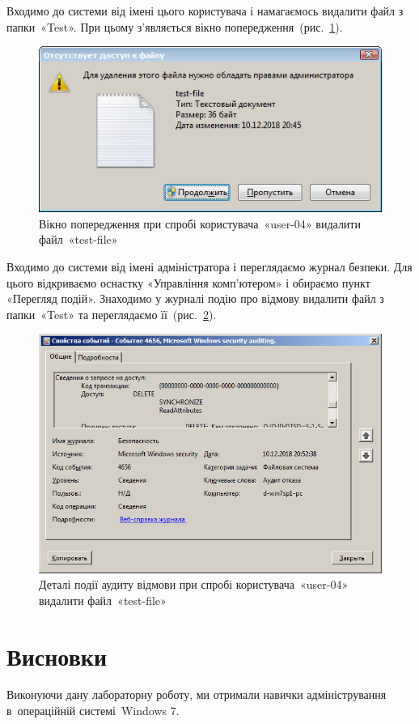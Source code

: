 \documentclass[
	a4paper,
	oneside,
	DIV = 12,
	fontsize = 13pt,
	headings = normal,
]{scrartcl}
\begin{document}
			Входимо до системи від імені цього користувача і намагаємось видалити файл з папки~«\textenglish{Test}». При цьому з'являється вікно попередження~(рис.~\ref{fig:dir-deletion-attempt-message}).

			\begin{figure}[!htbp]
				\centering
				\includegraphics[height = 9\baselineskip]{../01-solution/y03s01-pcdiag-lab-08-p19.png}
				\caption{Вікно попередження при спробі користувача~«\textenglish{user-04}» видалити файл~«\textenglish{test-file}»}
				\label{fig:dir-deletion-attempt-message}
			\end{figure}

			Входимо до системи від імені адміністратора і переглядаємо журнал безпеки. Для цього відкриваємо оснастку «Управління комп'ютером» і обираємо пункт «Перегляд подій». Знаходимо у журналі подію про відмову видалити файл з папки~«\textenglish{Test}» та переглядаємо її~(рис.~\ref{fig:dir-deletion-audit-event}).

			\begin{figure}[!htbp]
				\centering
				\includegraphics[height = 14\baselineskip]{../01-solution/y03s01-pcdiag-lab-08-p20.png}
				\caption{Деталі події аудиту відмови при спробі користувача~«\textenglish{user-04}» видалити файл~«\textenglish{test-file}»}
				\label{fig:dir-deletion-audit-event}
			\end{figure}

	\section{Висновки}
		Виконуючи дану лабораторну роботу, ми отримали навички адміністрування в~операційній системі~\textenglish{Windows 7}.
\end{document}
